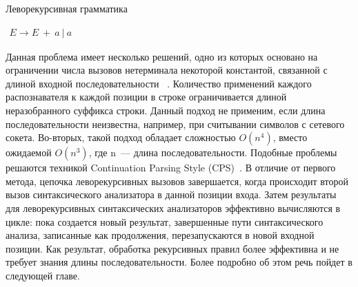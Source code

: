  \begin{listing}
\caption{Леворекурсивная грамматика}
\label{grmG2}
\centering
$\begin{array}{rl}
E \rightarrow E \ + \ a \ | \ a
\end{array}$
 \end{listing}

Данная проблема имеет несколько решений, одно из которых основано на ограничении числа вызовов нетерминала некоторой константой, связанной с длиной входной последовательности ~\cite{ParserComb}. Количество применений каждого распознавателя к каждой позиции в строке ограничивается длиной неразобранного суффикса строки. Данный подход не применим, если длина последовательности неизвестна, например, при считывании символов с сетевого сокета. Во-вторых, такой подход обладает сложностью $O(n^4)$, вместо ожидаемой $O(n^3)$, где n~--- длина последовательности. Подобные проблемы решаются техникой Continuation Parsing Style (CPS)~\cite{MemoizationInTopDown}. В отличие от первого метода, цепочка леворекурсивных вызовов завершается, когда происходит второй вызов синтаксического анализатора в данной позиции входа. Затем результаты для леворекурсивных синтаксических анализаторов эффективно вычисляются в цикле: пока создается новый результат, завершенные пути синтаксического анализа, записанные как продолжения, перезапускаются в новой входной позиции. Как результат, обработка рекурсивных правил более эффективна и не требует знания длины последовательности. Более подробно об этом речь пойдет в следующей главе.


